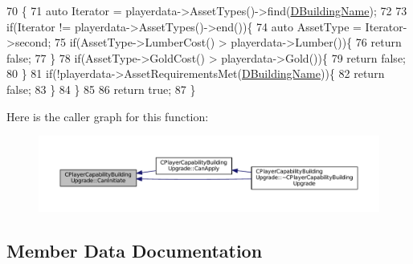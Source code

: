 \begin{DoxyCode}
70                                                                                                            
                         \{
71     \textcolor{keyword}{auto} Iterator = playerdata->AssetTypes()->find(\hyperlink{classCPlayerCapabilityBuildingUpgrade_a244e767a3e669441cfb03c13bf703e64}{DBuildingName});
72     
73     \textcolor{keywordflow}{if}(Iterator != playerdata->AssetTypes()->end())\{
74         \textcolor{keyword}{auto} AssetType = Iterator->second;
75         \textcolor{keywordflow}{if}(AssetType->LumberCost() > playerdata->Lumber())\{
76             \textcolor{keywordflow}{return} \textcolor{keyword}{false};   
77         \}
78         \textcolor{keywordflow}{if}(AssetType->GoldCost() > playerdata->Gold())\{
79             \textcolor{keywordflow}{return} \textcolor{keyword}{false};   
80         \}
81         \textcolor{keywordflow}{if}(!playerdata->AssetRequirementsMet(\hyperlink{classCPlayerCapabilityBuildingUpgrade_a244e767a3e669441cfb03c13bf703e64}{DBuildingName}))\{
82             \textcolor{keywordflow}{return} \textcolor{keyword}{false};
83         \}
84     \}
85     
86     \textcolor{keywordflow}{return} \textcolor{keyword}{true};
87 \}
\end{DoxyCode}
Here is the caller graph for this function\+:\nopagebreak
\begin{figure}[H]
\begin{center}
\leavevmode
\includegraphics[width=350pt]{classCPlayerCapabilityBuildingUpgrade_af515cec6f1a28607864c853307e17d7c_icgraph}
\end{center}
\end{figure}


\subsection{Member Data Documentation}
\hypertarget{classCPlayerCapabilityBuildingUpgrade_a244e767a3e669441cfb03c13bf703e64}{}\label{classCPlayerCapabilityBuildingUpgrade_a244e767a3e669441cfb03c13bf703e64} 
